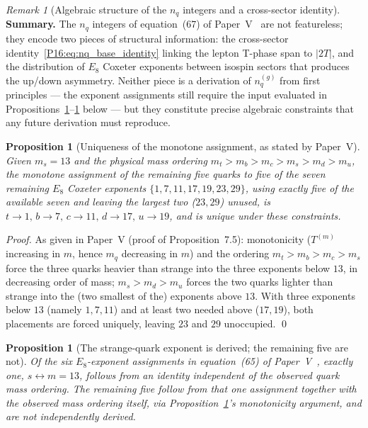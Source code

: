 \documentclass[11pt,a4paper]{article}
\newtheorem{proposition}[theorem]{Proposition}
\theoremstyle{definition}\newtheorem{definition}[theorem]{Definition}
\theoremstyle{remark}
\newtheorem{remark}[theorem]{Remark}
\theoremstyle{definition}\newtheorem{construction}[theorem]{Construction}
\newcommand{\twoT}{2T}
\begin{document}
\begin{remark}[Algebraic structure of the $n_q$ integers and a cross-sector identity]
\textbf{Summary.}
The $n_q$ integers of equation~(67) of Paper~V~\cite{Paper5} are not
featureless; they encode two pieces of structural information: the
cross-sector identity~\eqref{P16:eq:nq_base_identity} linking the lepton
T-phase span to $|\twoT|$, and the distribution of $E_8$ Coxeter
exponents between isospin sectors that produces the up/down asymmetry.
Neither piece is a derivation of $n_q^{(g)}$ from first principles
--- the exponent assignments still require the input evaluated in
Propositions~\ref{P16:prop:e8_unique}--\ref{P16:prop:e8_mixed} below --- but
they constitute precise algebraic constraints that any future
derivation must reproduce.
\end{remark}

\begin{proposition}[Uniqueness of the monotone assignment, as stated
  by Paper~V]
\label{P16:prop:e8_unique}
Given $m_s=13$ and the physical mass ordering
$m_t>m_b>m_c>m_s>m_d>m_u$, the monotone assignment of the remaining
five quarks to five of the seven remaining $E_8$ Coxeter exponents
$\{1,7,11,17,19,23,29\}$, using exactly five of the available seven
and leaving the largest two ($23,29$) unused, is
$t\to1,\,b\to7,\,c\to11,\,d\to17,\,u\to19$, and is unique under these
constraints.
\end{proposition}

\begin{proof}
As given in Paper~V (proof of Proposition~7.5): monotonicity
($T^{(m)}$ increasing in $m$, hence $m_q$ decreasing in $m$) and the
ordering $m_t>m_b>m_c>m_s$ force the three quarks heavier than
strange into the three exponents below $13$, in decreasing order of
mass; $m_s>m_d>m_u$ forces the two quarks lighter than strange into
the (two smallest of the) exponents above $13$. With three exponents
below $13$ (namely $1,7,11$) and at least two needed above
($17,19$), both placements are forced uniquely, leaving $23$ and
$29$ unoccupied.
\qed
\end{proof}

\begin{proposition}[The strange-quark exponent is derived; the
  remaining five are not]
\label{P16:prop:e8_mixed}
Of the six $E_8$-exponent assignments in equation~(65) of Paper~V~\cite{Paper5},
exactly one, $s\leftrightarrow m=13$, follows from an identity
independent of the observed quark mass ordering. The remaining five
follow from that one assignment together with the observed mass
ordering itself, via Proposition~\ref{P16:prop:e8_unique}'s monotonicity
argument, and are not independently derived.
\end{proposition}
\end{document}
